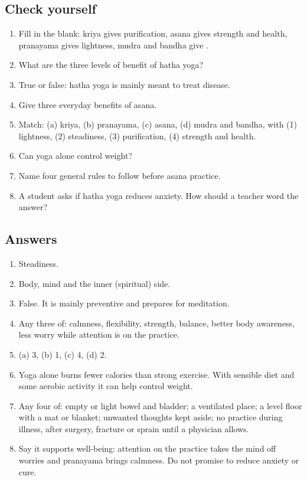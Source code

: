\subsection*{Check yourself}
\begin{enumerate}
\item Fill in the blank: kriya gives purification, asana gives strength and health, pranayama gives lightness, mudra and bandha give \underline{\hspace{2cm}}.
\item What are the three levels of benefit of hatha yoga?
\item True or false: hatha yoga is mainly meant to treat disease.
\item Give three everyday benefits of asana.
\item Match: (a) kriya, (b) pranayama, (c) asana, (d) mudra and bandha, with (1) lightness, (2) steadiness, (3) purification, (4) strength and health.
\item Can yoga alone control weight?
\item Name four general rules to follow before asana practice.
\item A student asks if hatha yoga reduces anxiety. How should a teacher word the answer?
\end{enumerate}

\subsection*{Answers}
\begin{enumerate}
\item Steadiness.
\item Body, mind and the inner (spiritual) side.
\item False. It is mainly preventive and prepares for meditation.
\item Any three of: calmness, flexibility, strength, balance, better body awareness, less worry while attention is on the practice.
\item (a) 3, (b) 1, (c) 4, (d) 2.
\item Yoga alone burns fewer calories than strong exercise. With sensible diet and some aerobic activity it can help control weight.
\item Any four of: empty or light bowel and bladder; a ventilated place; a level floor with a mat or blanket; unwanted thoughts kept aside; no practice during illness, after surgery, fracture or sprain until a physician allows.
\item Say it supports well-being: attention on the practice takes the mind off worries and pranayama brings calmness. Do not promise to reduce anxiety or cure.
\end{enumerate}

